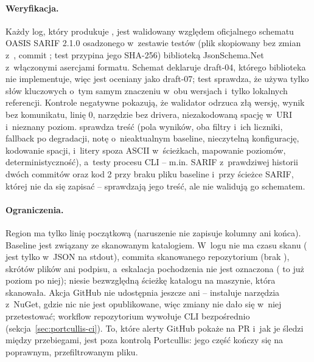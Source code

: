\paragraph{Weryfikacja.} Każdy log, który produkuje , jest
walidowany względem oficjalnego schematu OASIS SARIF 2.1.0 osadzonego w~zestawie testów (plik skopiowany bez
zmian z~, commit ; test przypina jego SHA-256)
biblioteką JsonSchema.Net z~włączonymi asercjami formatu. Schemat deklaruje draft-04, którego
biblioteka nie implementuje, więc jest oceniany jako draft-07; test sprawdza, że używa tylko
słów kluczowych o~tym samym znaczeniu w~obu wersjach i~tylko lokalnych referencji. Kontrole
negatywne pokazują, że walidator odrzuca złą wersję, wynik bez komunikatu, linię 0,
narzędzie bez drivera, niezakodowaną spację w~URI i~nieznany poziom. 
sprawdza treść (pola wyników, oba filtry i~ich liczniki, fallback po degradacji, notę
o~nieaktualnym baseline, nieczytelną konfigurację, kodowanie spacji, \repopath{\#} i~litery
spoza ASCII w~ścieżkach, mapowanie poziomów, deterministyczność), a~testy procesu CLI --
m.in. SARIF z~prawdziwej historii dwóch commitów oraz kod 2 przy braku pliku baseline
i~przy ścieżce SARIF, której nie da się zapisać -- sprawdzają jego treść, ale nie walidują
go schematem.

\paragraph{Ograniczenia.} Region ma tylko linię początkową (naruszenie nie zapisuje kolumny
ani końca). Baseline jest związany ze skanowanym katalogiem. W~logu nie ma czasu skanu
( jest tylko w~JSON na stdout), commita skanowanego repozytorium
(brak ), skrótów plików ani podpisu, a~eskalacja
pochodzenia nie jest oznaczona ( to już poziom po niej);
 niesie bezwzględną ścieżkę katalogu na maszynie, która
skanowała. Akcja GitHub nie udostępnia
jeszcze  ani  -- instaluje narzędzia z~NuGet, gdzie
nic nie jest opublikowane, więc zmiany nie dało się w~niej przetestować; workflow repozytorium
wywołuje CLI bezpośrednio (sekcja~\ref{sec:portcullis-ci}). To, które alerty GitHub pokaże
na PR i~jak je śledzi między przebiegami, jest poza kontrolą Portcullis: jego część kończy
się na poprawnym, przefiltrowanym pliku.


